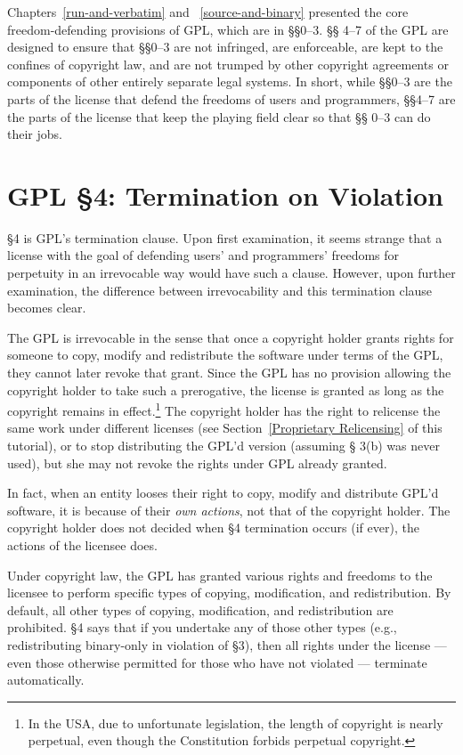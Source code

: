 \documentclass[11pt, letterpaper]{book}
\begin{document}
Chapters~\ref{run-and-verbatim} and ~\ref{source-and-binary} presented the
core freedom-defending provisions of GPL\@, which are in \S\S 0--3. \S\S
4--7 of the GPL are designed to ensure that \S\S 0--3 are not infringed,
are enforceable, are kept to the confines of copyright law, and are not
trumped by other copyright agreements or components of other entirely
separate legal systems. In short, while \S\S 0--3 are the parts of the
license that defend the freedoms of users and programmers, \S\S 4--7 are
the parts of the license that keep the playing field clear so that \S\S
0--3 can do their jobs.

\section{GPL \S 4: Termination on Violation}
\label{GPLs4}

\S 4 is GPL's termination clause. Upon first examination, it seems
strange that a license with the goal of defending users' and programmers'
freedoms for perpetuity in an irrevocable way would have such a clause.
However, upon further examination, the difference between irrevocability
and this termination clause becomes clear.

The GPL is irrevocable in the sense that once a copyright holder grants
rights for someone to copy, modify and redistribute the software under
terms of the GPL, they cannot later revoke that grant. Since the GPL has
no provision allowing the copyright holder to take such a prerogative, the
license is granted as long as the copyright remains in effect.\footnote{In
  the USA, due to unfortunate legislation, the length of copyright is
  nearly perpetual, even though the Constitution forbids perpetual
  copyright.} The copyright holder has the right to relicense the same
work under different licenses (see Section~\ref{Proprietary Relicensing}
of this tutorial), or to stop distributing the GPL'd version (assuming \S
3(b) was never used), but she may not revoke the rights under GPL
already granted.

In fact, when an entity looses their right to copy, modify and distribute
GPL'd software, it is because of their \emph{own actions}, not that of
the copyright holder. The copyright holder does not decided when \S 4
termination occurs (if ever), the actions of the licensee does.

Under copyright law, the GPL has granted various rights and freedoms to
the licensee to perform specific types of copying, modification, and
redistribution. By default, all other types of copying, modification, and
redistribution are prohibited. \S 4 says that if you undertake any of
those other types (e.g., redistributing binary-only in violation of \S 3),
then all rights under the license --- even those otherwise permitted for
those who have not violated --- terminate automatically.
\end{document}
